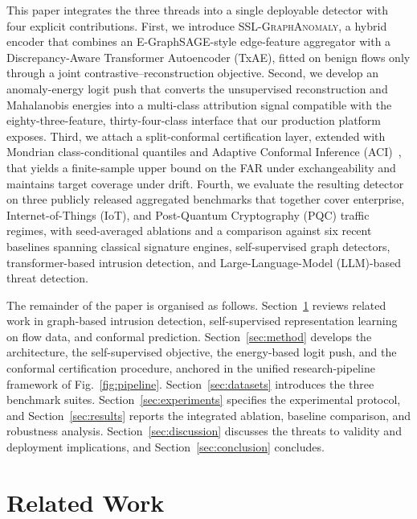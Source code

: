 \documentclass{ieeeaccess}
\begin{document}
This paper integrates the three threads into a single deployable detector
with four explicit contributions. First, we introduce \textsc{SSL-GraphAnomaly},
a hybrid encoder that combines an E-GraphSAGE-style edge-feature aggregator
with a Discrepancy-Aware Transformer Autoencoder (TxAE), fitted on benign
flows only through a joint contrastive--reconstruction objective. Second,
we develop an anomaly-energy logit push that converts the unsupervised
reconstruction and Mahalanobis energies into a multi-class attribution
signal compatible with the eighty-three-feature, thirty-four-class
interface that our production platform exposes. Third, we attach a
split-conformal certification layer, extended with Mondrian class-conditional
quantiles and Adaptive Conformal Inference (ACI)~\cite{gibbs2021aci,barber2023nonexch},
that yields a finite-sample upper bound on the FAR under exchangeability
and maintains target coverage under drift. Fourth, we evaluate the
resulting detector on three publicly released aggregated benchmarks that
together cover enterprise, Internet-of-Things (IoT), and Post-Quantum
Cryptography (PQC) traffic regimes, with seed-averaged ablations and a
comparison against six recent baselines spanning classical signature
engines, self-supervised graph detectors, transformer-based intrusion
detection, and Large-Language-Model (LLM)-based threat detection.

The remainder of the paper is organised as follows.
Section~\ref{sec:related} reviews related work in graph-based intrusion
detection, self-supervised representation learning on flow data, and
conformal prediction. Section~\ref{sec:method} develops the architecture,
the self-supervised objective, the energy-based logit push, and the
conformal certification procedure, anchored in the unified
research-pipeline framework of Fig.~\ref{fig:pipeline}.
Section~\ref{sec:datasets} introduces the three benchmark suites.
Section~\ref{sec:experiments} specifies the experimental protocol, and
Section~\ref{sec:results} reports the integrated ablation, baseline
comparison, and robustness analysis. Section~\ref{sec:discussion} discusses
the threats to validity and deployment implications, and
Section~\ref{sec:conclusion} concludes.

\section{Related Work}
\label{sec:related}
\end{document}

